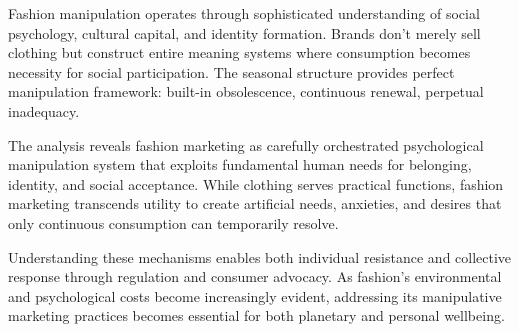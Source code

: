 Fashion manipulation operates through sophisticated understanding of social psychology, cultural capital, and identity formation. Brands don't merely sell clothing but construct entire meaning systems where consumption becomes necessity for social participation. The seasonal structure provides perfect manipulation framework: built-in obsolescence, continuous renewal, perpetual inadequacy.

The analysis reveals fashion marketing as carefully orchestrated psychological manipulation system that exploits fundamental human needs for belonging, identity, and social acceptance. While clothing serves practical functions, fashion marketing transcends utility to create artificial needs, anxieties, and desires that only continuous consumption can temporarily resolve.

Understanding these mechanisms enables both individual resistance and collective response through regulation and consumer advocacy. As fashion's environmental and psychological costs become increasingly evident, addressing its manipulative marketing practices becomes essential for both planetary and personal wellbeing.